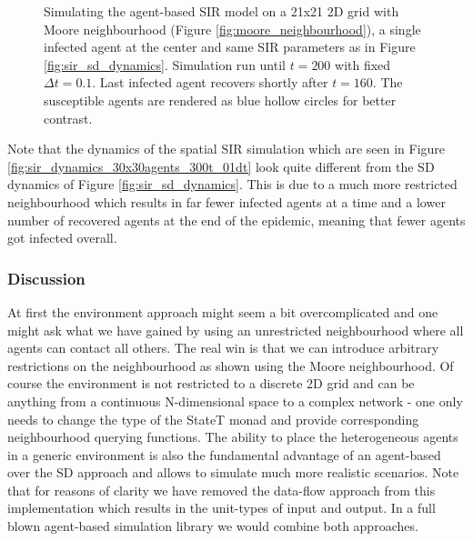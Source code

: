 \begin{figure}
\begin{center}
	\caption{Simulating the agent-based SIR model on a 21x21 2D grid with Moore neighbourhood (Figure \ref{fig:moore_neighbourhood}), a single infected agent at the center and same SIR parameters as in Figure \ref{fig:sir_sd_dynamics}. Simulation run until $t = 200$ with fixed $\Delta t = 0.1$. Last infected agent recovers shortly after $t = 160$. The susceptible agents are rendered as blue hollow circles for better contrast.}
	\label{fig:sir_env}
\end{center}
\end{figure}

Note that the dynamics of the spatial SIR simulation which are seen in Figure \ref{fig:sir_dynamics_30x30agents_300t_01dt} look quite different from the SD dynamics of Figure \ref{fig:sir_sd_dynamics}. This is due to a much more restricted neighbourhood which results in far fewer infected agents at a time and a lower number of recovered agents at the end of the epidemic, meaning that fewer agents got infected overall.

\subsubsection{Discussion}
At first the environment approach might seem a bit overcomplicated and one might ask what we have gained by using an unrestricted neighbourhood where all agents can contact all others. The real win is that we can introduce arbitrary restrictions on the neighbourhood as shown using the Moore neighbourhood. Of course the environment is not restricted to a discrete 2D grid and can be anything from a continuous N-dimensional space to a complex network - one only needs to change the type of the StateT monad and provide corresponding neighbourhood querying functions. The ability to place the heterogeneous agents in a generic environment is also the fundamental advantage of an agent-based over the SD approach and allows to simulate much more realistic scenarios. Note that for reasons of clarity we have removed the data-flow approach from this implementation which results in the unit-types of input and output. In a full blown agent-based simulation library we would combine both approaches.

